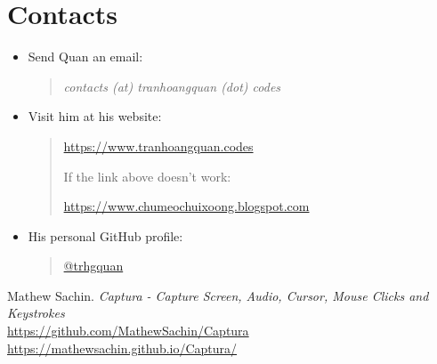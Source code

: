 \documentclass{article}
\begin{document}
    \section{Contacts}
        \begin{itemize}
            \item Send Quan an email:
            \begin{quote}
                \itshape{contacts (at) tranhoangquan (dot) codes}
            \end{quote}
            \item Visit him at his website:
            \begin{quote}
                \href{https://www.tranhoangquan.codes}{https://www.tranhoangquan.codes}

                If the link above doesn't work:

                \href{https://www.chumeochuixoong.blogspot.com}{https://www.chumeochuixoong.blogspot.com}
            \end{quote}
            \item His personal GitHub profile:
            \begin{quote}
                \href{https://github.com/trhgquan}{@trhgquan}
            \end{quote}
        \end{itemize}


    \begin{thebibliography}{5}
        Mathew Sachin.
        \textit{Captura - Capture Screen, Audio, Cursor, Mouse Clicks and Keystrokes}\\
        \href{https://github.com/MathewSachin/Captura}{https://github.com/MathewSachin/Captura}\\
        \href{https://mathewsachin.github.io/Captura/}{https://mathewsachin.github.io/Captura/}
    \end{thebibliography}
\end{document}
